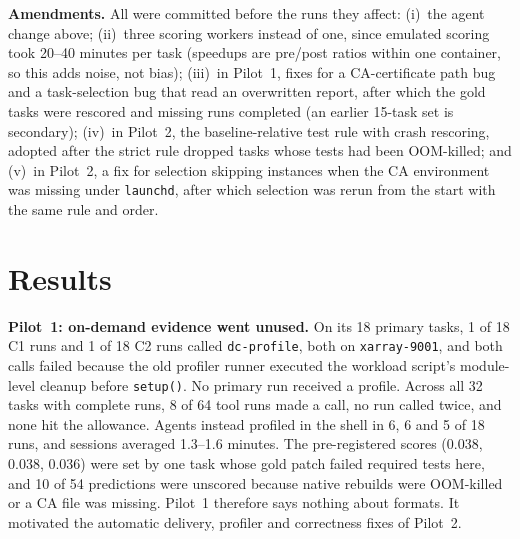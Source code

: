 \documentclass[conference]{IEEEtran}
\newcommand{\tool}{\texttt{dc-profile}}
\begin{document}
\textbf{Amendments.} All were committed before the runs they affect:
(i)~the agent change above; (ii)~three scoring workers instead of one, since
emulated scoring took 20--40 minutes per task (speedups are pre/post ratios
within one container, so this adds noise, not bias); (iii)~in Pilot~1, fixes
for a CA-certificate path bug and a task-selection bug that read an
overwritten report, after which the gold tasks were rescored and missing runs
completed (an earlier 15-task set is secondary); (iv)~in Pilot~2, the
baseline-relative test rule with crash rescoring, adopted after the strict
rule dropped tasks whose tests had been OOM-killed; and (v)~in Pilot~2, a fix
for selection skipping instances when the CA environment was missing under
\texttt{launchd}, after which selection was rerun from the start with the same
rule and order.

\section{Results}
\label{sec:results}

\textbf{Pilot~1: on-demand evidence went unused.} On its 18 primary tasks, 1 of
18 C1 runs and 1 of 18 C2 runs called \tool{}, both on \texttt{xarray-9001},
and both calls failed because the old profiler runner executed the workload
script's module-level cleanup before \texttt{setup()}. No primary run received
a profile. Across all 32 tasks with complete runs, 8 of 64 tool runs made a
call, no run called twice, and none hit the allowance. Agents instead
profiled in the shell in 6, 6 and 5 of 18 runs, and sessions averaged
1.3--1.6 minutes. The pre-registered scores (0.038, 0.038, 0.036) were set by
one task whose gold patch failed required tests here, and 10 of 54
predictions were unscored because native rebuilds were OOM-killed or a CA
file was missing. Pilot~1 therefore says nothing about formats. It motivated
the automatic delivery, profiler and correctness fixes of Pilot~2.
\end{document}

